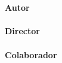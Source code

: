 {\begin{large}
\begin{center}
\textoPrimerSubtituloPortadaVal
\mbox{ } \\ \mbox{ } \\ 
{\Large \bfseries Autor}\\
\textbf{\autorPortadaVal}\\[1.0cm]
{\Large \bfseries Director}\\
\textbf{\directorPortadaVal}\\[0.3cm]
{\Large \bfseries Colaborador}\\
\textbf{\colaboradorPortadaVal}\\[0.3cm]
\mbox{ } \\ \mbox{ } \\ 
\textoSegundoSubtituloPortadaVal \\ [0.3em]
\end{center}
\end{large}

\vfill

\begin{large}
\begin{center}
\textbf{\institucionVal}\\[0.2em]
    \mbox{ }  \\
\textbf{\fechaPublicacionVal}
\end{center}
\end{large}


\newpage
\thispagestyle{empty}
%

} %

